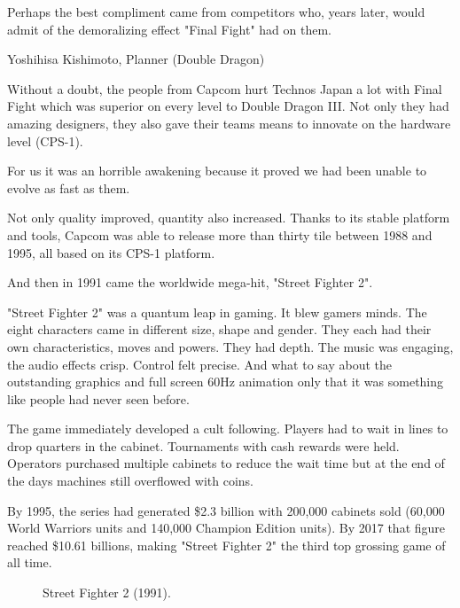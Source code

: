 Perhaps the best compliment came from competitors who, years later, would admit of the demoralizing effect "Final Fight" had on them.

\begin{q}{Yoshihisa Kishimoto, Planner\cite{dd} (Double Dragon)}
  

  Without a doubt, the people from Capcom hurt Technos Japan a lot with Final Fight which was superior on every level to Double Dragon III. Not only they had amazing designers, they also gave their teams means to innovate on the hardware level (CPS-1). 

  For us it was an horrible awakening because it proved we had been unable to evolve as fast as them.
  \end{q}



Not only quality improved, quantity also increased. Thanks to its stable platform and tools, Capcom was able to release more than thirty tile between 1988 and 1995, all based on its CPS-1 platform.

And then in 1991 came the worldwide mega-hit, "Street Fighter 2".

"Street Fighter 2" was a quantum leap in gaming. It blew gamers minds. The eight characters came in different size, shape and gender. They each had their own characteristics, moves and powers. They had depth. The music was engaging, the audio effects crisp. Control felt precise. And what to say about the outstanding graphics and full screen 60Hz animation only that it was something like people had never seen before.


The game immediately developed a cult following. Players had to wait in lines to drop quarters in the cabinet. Tournaments with cash rewards were held. Operators purchased multiple cabinets\cite{sf2_oral_history} to reduce the wait time but at the end of the days machines still overflowed with coins.



By 1995, the series had generated \$2.3 billion with 200,000 cabinets sold\cite{usgamer20160101} (60,000 World Warriors units and 140,000 Champion Edition units). By 2017 that figure reached \$10.61 billions\cite{gamerevolution20140126}, making "Street Fighter 2" the third top grossing game of all time.

\label{nin_sf2}
\begin{figure}[H]
\caption*{Street Fighter 2 (1991).}
\end{figure}


